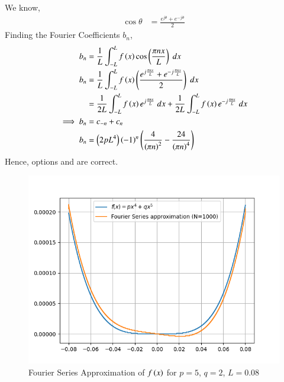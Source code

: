 \documentclass[journal,12pt,twocolumn]{IEEEtran}
\theoremstyle{remark}
\begin{document}
We know,
\begin{align}
    \cos\theta&=\frac{e^{j\theta}+e^{-j\theta}}{2}
\end{align}
Finding the Fourier Coefficients $b_n$,
\begin{align}
    b_n&=\frac{1}{L}\int_{-L}^{L}f\left(x\right)\cos\left(\frac{\pi nx}{L}\right)\;dx\\
    b_n&=\frac{1}{L}\int_{-L}^{L}f\left(x\right)\left(\frac{e^{j\frac{\pi n x}{L}}+e^{-j\frac{\pi n x}{L}}}{2}\right)\;dx\\
    &=\frac{1}{2L}\int_{-L}^{L}f\left(x\right)e^{j\frac{\pi n x}{L}}\;dx+\frac{1}{2L}\int_{-L}^{L}f\left(x\right)e^{-j\frac{\pi n x}{L}}\;dx\\
    \implies b_n&=c_{-n}+c_n\\
    b_n&=\left(2pL^4\right)\left(-1\right)^n\left(\frac{4}{\left(\pi n\right)^2}-\frac{24}{\left(\pi n\right)^4}\right)
\end{align}
Hence, options  and  are correct.
\begin{figure}[h!]
    \centering
    \includegraphics[width=\linewidth]{figs/Figure_1.png}
    \caption{Fourier Series Approximation of $f\left(x\right)$ for $p=5$, $q=2$, $L=0.08$}
\end{figure}
\end{document}
